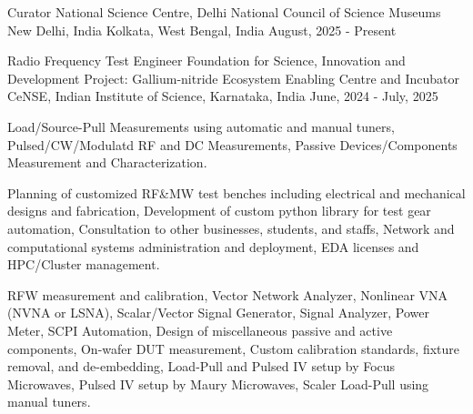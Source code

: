 

\begin{cventries}
\cventry
{Curator} %
{National Science Centre, Delhi \linebreak National Council of Science Museums} %
{New Delhi, India \linebreak Kolkata, West Bengal, India} %
{August, 2025 - Present} %
{
}


  \cventry
    {Radio Frequency Test Engineer} %
    {Foundation for Science, Innovation and Development \linebreak Project: Gallium-nitride Ecosystem Enabling Centre and Incubator} %
    {CeNSE, Indian Institute of Science, Karnataka, India} %
    {June, 2024 - July, 2025} %
    {
      \begin{cvitems} %
        \item { Load/Source-Pull Measurements using automatic and manual tuners, Pulsed/CW/Modulatd RF and DC Measurements, Passive Devices/Components Measurement and Characterization.}
        \item { Planning of customized RF\&MW test benches including electrical and mechanical designs and fabrication, Development of custom python library for test gear automation, Consultation to other businesses, students, and staffs, Network and computational systems administration and deployment, EDA licenses and HPC/Cluster management.}
        \item { RF{\textmu}W measurement and calibration, Vector Network Analyzer, Nonlinear VNA (NVNA or LSNA), Scalar/Vector Signal Generator, Signal Analyzer, Power Meter, SCPI Automation, Design of miscellaneous passive and active components, On-wafer DUT measurement, Custom calibration standards, fixture removal, and de-embedding, Load-Pull and Pulsed IV setup by Focus Microwaves, Pulsed IV setup by Maury Microwaves, Scaler Load-Pull using manual tuners.}
      \end{cvitems}
    }

\end{cventries}